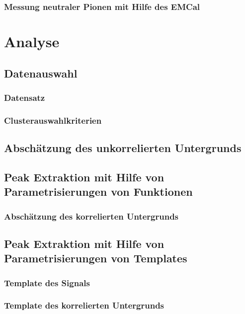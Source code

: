\documentclass[11pt]{article}
\begin{document}
\subsubsection{Messung neutraler Pionen mit Hilfe des EMCal} \label{s2s2s1}

\newpage
\section{Analyse} \label{s3}

\subsection{Datenauswahl} \label{s3s1}

\subsubsection{Datensatz} \label{s3s1s1}

\subsubsection{Clusterauswahlkriterien} \label{s3s1s2}

\subsection{Absch{\"a}tzung des unkorrelierten Untergrunds} \label{s3s2}

\subsection{Peak Extraktion mit Hilfe von Parametrisierungen von Funktionen} \label{s3s3}

\subsubsection{Absch{\"a}tzung des korrelierten Untergrunds} \label{s3s3s1}

\subsection{Peak Extraktion mit Hilfe von Parametrisierungen von Templates} \label{s3s4}

\subsubsection{Template des Signals} \label{s3s4s1}

\subsubsection{Template des korrelierten Untergrunds} \label{s3s4s2}
\end{document}
